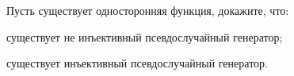 Пусть существует односторонняя функция, докажите, что:
\begin{enumcyr}
    \item существует не инъективный псевдослучайный генератор;
    \item существует инъективный псевдослучайный генератор.
\end{enumcyr}